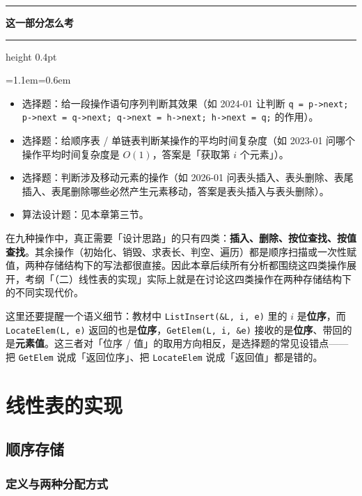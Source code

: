 \documentclass[11pt,openany,UTF8]{ctexbook}
\newcommand{\callouthead}[2]{%
  \par\addvspace{7pt}\noindent
  {\color{#1}\rule[-0.15em]{3pt}{1.05em}}\hspace{0.5em}%
  {\bfseries\color{#1}#2}\par\nobreak\vspace{-0.35em}%
  {\color{rulesep}\hrule height 0.4pt}\nobreak\vspace{0.45em}%
  \begingroup\small\setlength{\parindent}{0pt}%
  \leftskip=1.1em\rightskip=0.6em\noindent\ignorespaces}
\newcommand{\calloutend}{\par\endgroup\addvspace{7pt}}
\newenvironment{callexam}[1]{\callouthead{exambar}{#1}}{\calloutend}
\begin{document}
\begin{callexam}{这一部分怎么考}
\begin{itemize}
\item 选择题：给一段操作语句序列判断其效果（如 2024-01 让判断 \texttt{q =\allowbreak{} p->\allowbreak{}next;\allowbreak{} p->\allowbreak{}next =\allowbreak{} q->\allowbreak{}next;\allowbreak{} q->\allowbreak{}next =\allowbreak{} h->\allowbreak{}next;\allowbreak{} h->\allowbreak{}next =\allowbreak{} q;\allowbreak{}} 的作用）。
\item 选择题：给顺序表 / 单链表判断某操作的平均时间复杂度（如 2023-01 问哪个操作平均时间复杂度是 $O(1)$，答案是「获取第 $i$ 个元素」）。
\item 选择题：判断涉及移动元素的操作（如 2026-01 问表头插入、表头删除、表尾插入、表尾删除哪些必然产生元素移动，答案是表头插入与表头删除）。
\item 算法设计题：见本章第三节。
\end{itemize}
\end{callexam}

在九种操作中，真正需要「设计思路」的只有四类：\textbf{插入、删除、按位查找、按值查找}。其余操作（初始化、销毁、求表长、判空、遍历）都是顺序扫描或一次性赋值，两种存储结构下的写法都很直接。因此本章后续所有分析都围绕这四类操作展开，考纲「（二）线性表的实现」实际上就是在讨论这四类操作在两种存储结构下的不同实现代价。

这里还要提醒一个语义细节：教材中 \texttt{ListInsert(\&L,\allowbreak{} i,\allowbreak{} e)\allowbreak{}} 里的 $i$ 是\textbf{位序}，而 \texttt{LocateElem(L,\allowbreak{} e)\allowbreak{}} 返回的也是\textbf{位序}，\texttt{GetElem(L,\allowbreak{} i,\allowbreak{} \&e)\allowbreak{}} 接收的是\textbf{位序}、带回的是\textbf{元素值}。这三者对「位序 / 值」的取用方向相反，是选择题的常见设错点——把 \texttt{GetElem} 说成「返回位序」、把 \texttt{LocateElem} 说成「返回值」都是错的。

\section{线性表的实现}

\subsection{顺序存储}

\subsubsection{定义与两种分配方式}
\end{document}
